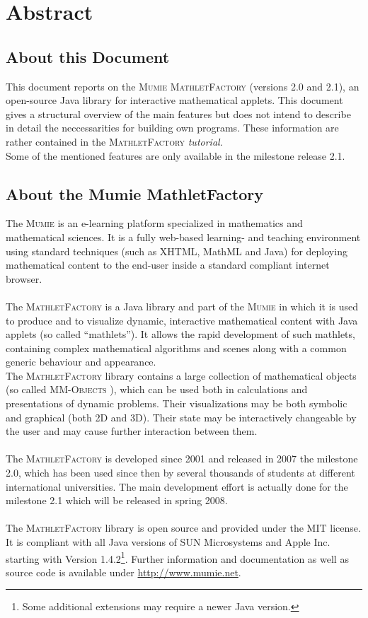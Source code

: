 \documentclass[a4paper,12pt]{article}
\newcommand{\name}[1]{\textsc{#1}}
\newcommand{\mf}{\name{MathletFactory }}
\newcommand{\mumie}{\name{Mumie }}
\newcommand{\mmos}{\name{MM-Objects }}
\begin{document}
\newpage

\tableofcontents 

\newpage

\section{Abstract}

\subsection{About this Document}

This document reports on the \mumie \mf (versions 2.0 and 2.1), an  open-source Java library for interactive mathematical applets.
This document gives a structural overview of the main features but does not intend to describe in detail the
neccessarities for building own programs. These information are rather contained in the \mf \textit{tutorial}.\\
Some of the mentioned features are only available in the milestone release 2.1.

\subsection{About the Mumie MathletFactory}
The \mumie is an e-learning platform specialized in mathematics and mathematical sciences.
It is a fully web-based learning- and teaching environment using standard techniques
(such as XHTML, MathML and Java) for deploying mathematical content to the end-user inside 
a standard compliant internet browser.\\
\\
The \mf is a Java library and part of the \mumie in which it is used to produce and to visualize
dynamic, interactive mathematical content with Java applets (so called ``mathlets''). It allows
the rapid development of such mathlets, containing complex mathematical algorithms and scenes
along with a common generic behaviour and appearance.\\
The \mf library contains a large collection of mathematical objects (so called \mmos), which can 
be used both in calculations and presentations of dynamic problems.
Their visualizations may be both symbolic and graphical (both 2D and 3D).
Their state may be interactively changeable by the user and may cause further interaction between them.\\
\\
The \mf is developed since 2001 and released in 2007 the milestone 2.0, which has been used since then by
several thousands of students at different international universities. The main development
effort is actually done for the milestone 2.1 which will be released in spring 2008.\\
\\
The \mf library is open source and provided under the MIT license. It is compliant with 
all Java versions of SUN Microsystems and Apple Inc. starting with Version 1.4.2\footnote{Some 
additional extensions may require a newer Java version.}. Further information and documentation 
as well as source code is available under \url{http://www.mumie.net}.
\end{document}
